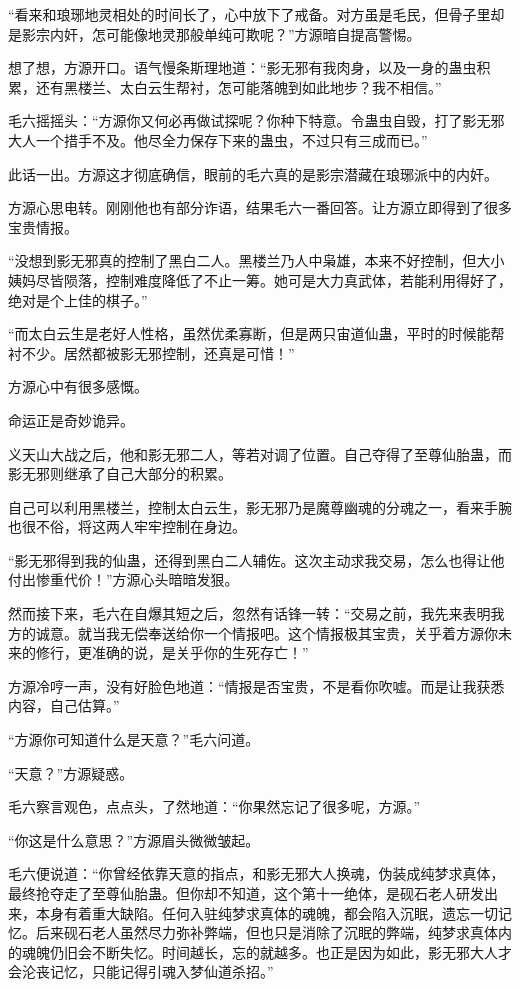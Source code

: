 \begin{this_body}
“看来和琅琊地灵相处的时间长了，心中放下了戒备。对方虽是毛民，但骨子里却是影宗内奸，怎可能像地灵那般单纯可欺呢？”方源暗自提高警惕。

想了想，方源开口。语气慢条斯理地道：“影无邪有我肉身，以及一身的蛊虫积累，还有黑楼兰、太白云生帮衬，怎可能落魄到如此地步？我不相信。”

毛六摇摇头：“方源你又何必再做试探呢？你种下特意。令蛊虫自毁，打了影无邪大人一个措手不及。他尽全力保存下来的蛊虫，不过只有三成而已。”

此话一出。方源这才彻底确信，眼前的毛六真的是影宗潜藏在琅琊派中的内奸。

方源心思电转。刚刚他也有部分诈语，结果毛六一番回答。让方源立即得到了很多宝贵情报。

“没想到影无邪真的控制了黑白二人。黑楼兰乃人中枭雄，本来不好控制，但大小姨妈尽皆陨落，控制难度降低了不止一筹。她可是大力真武体，若能利用得好了，绝对是个上佳的棋子。”

“而太白云生是老好人性格，虽然优柔寡断，但是两只宙道仙蛊，平时的时候能帮衬不少。居然都被影无邪控制，还真是可惜！”

方源心中有很多感慨。

命运正是奇妙诡异。

义天山大战之后，他和影无邪二人，等若对调了位置。自己夺得了至尊仙胎蛊，而影无邪则继承了自己大部分的积累。

自己可以利用黑楼兰，控制太白云生，影无邪乃是魔尊幽魂的分魂之一，看来手腕也很不俗，将这两人牢牢控制在身边。

“影无邪得到我的仙蛊，还得到黑白二人辅佐。这次主动求我交易，怎么也得让他付出惨重代价！”方源心头暗暗发狠。

然而接下来，毛六在自爆其短之后，忽然有话锋一转：“交易之前，我先来表明我方的诚意。就当我无偿奉送给你一个情报吧。这个情报极其宝贵，关乎着方源你未来的修行，更准确的说，是关乎你的生死存亡！”

方源冷哼一声，没有好脸色地道：“情报是否宝贵，不是看你吹嘘。而是让我获悉内容，自己估算。”

“方源你可知道什么是天意？”毛六问道。

“天意？”方源疑惑。

毛六察言观色，点点头，了然地道：“你果然忘记了很多呢，方源。”

“你这是什么意思？”方源眉头微微皱起。

毛六便说道：“你曾经依靠天意的指点，和影无邪大人换魂，伪装成纯梦求真体，最终抢夺走了至尊仙胎蛊。但你却不知道，这个第十一绝体，是砚石老人研发出来，本身有着重大缺陷。任何入驻纯梦求真体的魂魄，都会陷入沉眠，遗忘一切记忆。后来砚石老人虽然尽力弥补弊端，但也只是消除了沉眠的弊端，纯梦求真体内的魂魄仍旧会不断失忆。时间越长，忘的就越多。也正是因为如此，影无邪大人才会沦丧记忆，只能记得引魂入梦仙道杀招。”


\end{this_body}
